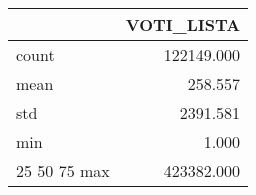 \begin{tabular}{lr}
\toprule
 & VOTI_LISTA \\
\midrule
count & 122149.000 \\
mean & 258.557 \\
std & 2391.581 \\
min & 1.000 \\
25%
50%
75%
max & 423382.000 \\
\bottomrule
\end{tabular}
